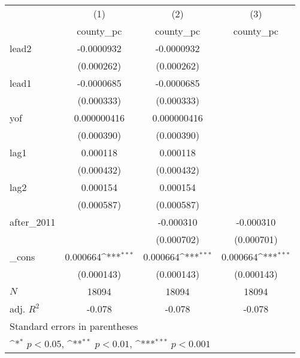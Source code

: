 {
\def\sym#1{\ifmmode^{#1}\else\(^{#1}\)\fi}
\begin{tabular}{l*{3}{c}}
\hline\hline
            &\multicolumn{1}{c}{(1)}&\multicolumn{1}{c}{(2)}&\multicolumn{1}{c}{(3)}\\
            &\multicolumn{1}{c}{county\_pc}&\multicolumn{1}{c}{county\_pc}&\multicolumn{1}{c}{county\_pc}\\
\hline
lead2       &  -0.0000932         &  -0.0000932         &                     \\
            &  (0.000262)         &  (0.000262)         &                     \\
[1em]
lead1       &  -0.0000685         &  -0.0000685         &                     \\
            &  (0.000333)         &  (0.000333)         &                     \\
[1em]
yof         & 0.000000416         & 0.000000416         &                     \\
            &  (0.000390)         &  (0.000390)         &                     \\
[1em]
lag1        &    0.000118         &    0.000118         &                     \\
            &  (0.000432)         &  (0.000432)         &                     \\
[1em]
lag2        &    0.000154         &    0.000154         &                     \\
            &  (0.000587)         &  (0.000587)         &                     \\
[1em]
after\_2011  &                     &   -0.000310         &   -0.000310         \\
            &                     &  (0.000702)         &  (0.000701)         \\
[1em]
\_cons      &    0.000664\sym{***}&    0.000664\sym{***}&    0.000664\sym{***}\\
            &  (0.000143)         &  (0.000143)         &  (0.000143)         \\
\hline
\(N\)       &       18094         &       18094         &       18094         \\
adj. \(R^{2}\)&      -0.078         &      -0.078         &      -0.078         \\
\hline\hline
\multicolumn{4}{l}{\footnotesize Standard errors in parentheses}\\
\multicolumn{4}{l}{\footnotesize \sym{*} \(p<0.05\), \sym{**} \(p<0.01\), \sym{***} \(p<0.001\)}\\
\end{tabular}
}
